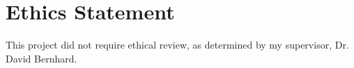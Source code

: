\chapter*{Ethics Statement}
\vspace{1cm}

\noindent
This project did not require ethical review, as determined by my supervisor,
Dr. David Bernhard.
